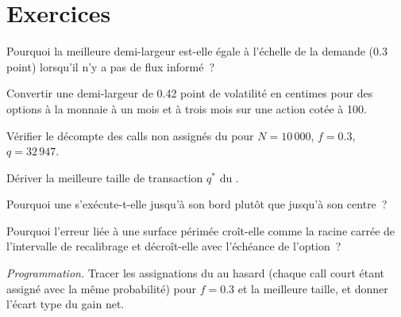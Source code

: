 \section{Exercices}

\begin{exercise}[$\star$]\label{exo:dv:options-market-making-in-practice:1}
Pourquoi la meilleure demi-largeur est-elle égale à l'échelle de la demande (0.3 point) lorsqu'il n'y a pas de flux informé~?
\end{exercise}

\begin{exercise}[$\star$]\label{exo:dv:options-market-making-in-practice:2}
Convertir une demi-largeur de 0.42 point de volatilité en centimes pour des options à la monnaie à un mois et à trois mois sur une action cotée à 100.
\end{exercise}

\begin{exercise}[$\star$]\label{exo:dv:options-market-making-in-practice:3}
Vérifier le décompte des calls non assignés du  pour $N=10\,000$, $f=0.3$, $q=32\,947$.
\end{exercise}

\begin{exercise}[$\star\star$]\label{exo:dv:options-market-making-in-practice:4}
Dériver la meilleure taille de transaction $q^*$ du .
\end{exercise}

\begin{exercise}[$\star\star$]\label{exo:dv:options-market-making-in-practice:5}
Pourquoi une  s'exécute-t-elle jusqu'à son bord plutôt que jusqu'à son centre~?
\end{exercise}

\begin{exercise}[$\star\star$]\label{exo:dv:options-market-making-in-practice:6}
Pourquoi l'erreur liée à une surface périmée croît-elle comme la racine carrée de l'intervalle de recalibrage et décroît-elle avec l'échéance de l'option~?
\end{exercise}

\begin{exercise}[$\star\star\star$]\label{exo:dv:options-market-making-in-practice:7}
\emph{Programmation.} Tracer les assignations du  au hasard (chaque call court étant assigné avec la même probabilité) pour $f=0.3$ et la meilleure taille, et donner
l'écart type du gain net.
\end{exercise}

